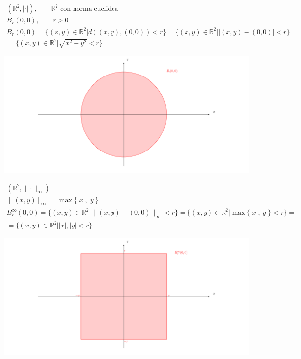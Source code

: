 	
\begin{exbar}
	\begin{gather*}
		(\mathbb{R}^2, | \cdot |), \qquad \mathbb{R}^2 \text{ con norma euclidea}
		\\
		B_r (0,0), \qquad r > 0
		\\
		B_r (0,0) 
		= \{ (x,y) \in \mathbb{R}^2 \big| d((x,y), (0,0)) < r \} 
		= \{ (x,y) \in \mathbb{R}^2 \big| |(x,y)-(0,0)| < r \} =
		\\ 
		= \{ (x,y) \in \mathbb{R}^2 \big| \sqrt{x^2+y^2} < r\}
	\end{gather*}
	\begin{center}
		\includegraphics[width=0.75\linewidth]{spazi_metrici_e_normati/pag137circle}
		\label{fig:pag137circle}
	\end{center}
	
	\begin{gather*}
	 	(\mathbb{R}^2, \parallel \cdot \parallel_\infty)
	 	\\
		\parallel (x,y) \parallel_\infty = \max \{|x|,|y|\} 
		\\
		B_r^\infty (0,0) 
		= \{ (x,y) \in \mathbb{R}^2 \big| \parallel(x,y) - (0,0) \parallel_\infty < r \} 
		= \{ (x,y) \in \mathbb{R}^2 \big| \max \{|x|,|y| \} < r \} =
		\\
		= \{ (x,y) \in \mathbb{R}^2 \big| |x|,|y| < r\}
	\end{gather*}
	\begin{center}
		\includegraphics[width=0.75\linewidth]{spazi_metrici_e_normati/pag137square}
		\label{fig:pag137square}
	\end{center}
	

\end{exbar}
